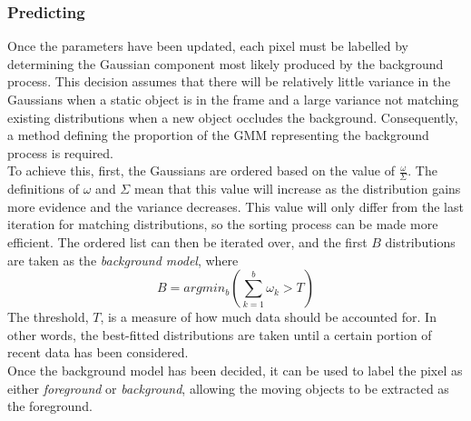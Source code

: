 \subsubsection{Predicting}
\setlength{\leftskip}{0.5cm}
\indent \indent
Once the parameters have been updated, each pixel must be labelled by determining the Gaussian component most likely produced by the background process. This decision assumes that there will be relatively little variance in the Gaussians when a static object is in the frame and a large variance not matching existing distributions when a new object occludes the background. Consequently, a method defining the proportion of the GMM representing the background process is required.
\smallskip \\ \indent
To achieve this, first, the Gaussians are ordered based on the value of $\frac{\omega}{\Sigma}$. The definitions of $\omega$ and $\Sigma$ mean that this value will increase as the distribution gains more evidence and the variance decreases. This value will only differ from the last iteration for matching distributions, so the sorting process can be made more efficient. The ordered list can then be iterated over, and the first $B$ distributions are taken as the \textit{background model}, where 
\begin{equation}
    \label{eq:gmmInequality}
    B = argmin_b \left( \sum^b_{k=1} \omega_k > T \right)
\end{equation}
The threshold, $T$, is a measure of how much data should be accounted for. In other words, the best-fitted distributions are taken until a certain portion of recent data has been considered. 
\smallskip \\ \indent
Once the background model has been decided, it can be used to label the pixel as either \textit{foreground} or \textit{background}, allowing the moving objects to be extracted as the foreground.

\setlength{\leftskip}{0cm}
